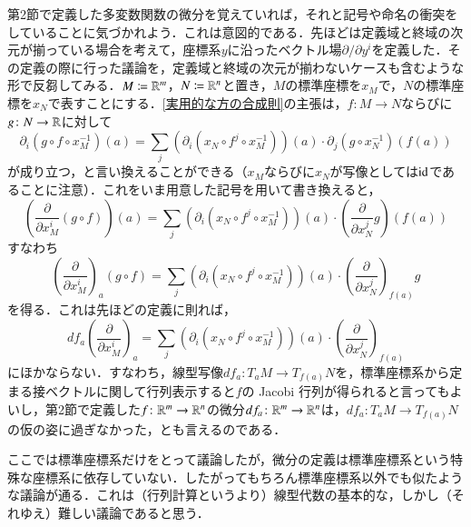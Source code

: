 第2節で定義した多変数関数の微分を覚えていれば，それと記号や命名の衝突をしていることに気づかれよう．これは意図的である．先ほどは定義域と終域の次元が揃っている場合を考えて，座標系$y$に沿ったベクトル場$\partial / \partial y^i$を定義した．その定義の際に行った議論を，定義域と終域の次元が揃わないケースも含むような形で反芻してみる．$M \coloneqq \mathbb{R}^m$，$N \coloneqq \mathbb{R}^n$と置き，$M$の標準座標を$x_M$で，$N$の標準座標を$x_N$で表すことにする．\cref{実用的な方の合成則}の主張は，$f \colon M \to N$ならびに$g \colon N \to \mathbb{R}$に対して
\begin{equation}
\partial_i (g \circ f \circ x_M^{-1}) (a) = \sum_{j} \left( \partial_i (x_N \circ f^j \circ x_M^{-1}) \right) (a) \cdot \partial_j (g \circ x_N^{-1}) (f(a))
\end{equation}が成り立つ，と言い換えることができる（$x_M$ならびに$x_N$が写像としては$\operatorname{id}$であることに注意）．これをいま用意した記号を用いて書き換えると，
\begin{equation}
\left( \frac{\partial}{\partial x^i_M} (g \circ f) \right) (a) = \sum_{j} \left( \partial_i (x_N \circ f^j \circ x_M^{-1}) \right) (a) \cdot \left(\frac{\partial}{\partial x_N^j} g\right) (f(a))
\end{equation}
すなわち
\begin{equation}
\left( \frac{\partial}{\partial x^i_M} \right)_a (g \circ f) = \sum_{j} \left( \partial_i (x_N \circ f^j \circ x_M^{-1}) \right) (a) \cdot \left(\frac{\partial}{\partial x_N^j}\right)_{f(a)} g
\end{equation}
を得る．これは先ほどの定義に則れば，
\begin{equation}
df_a \left( \frac{\partial}{\partial x^i_M} \right)_a = \sum_{j} \left( \partial_i (x_N \circ f^j \circ x_M^{-1}) \right) (a) \cdot \left(\frac{\partial}{\partial x_N^j}\right)_{f(a)}
\end{equation}にほかならない．すなわち，線型写像$df_a \colon T_aM \to T_{f(a)}N$を，標準座標系から定まる接ベクトルに関して行列表示すると$f$の Jacobi 行列が得られると言ってもよいし，第2節で定義した$f \colon \mathbb{R}^m \to \mathbb{R}^n$の微分$df_a \colon \mathbb{R}^m \to \mathbb{R}^n$は，$df_a \colon T_aM \to T_{f(a)}N$の仮の姿に過ぎなかった，とも言えるのである．

\begin{que}
ここでは標準座標系だけをとって議論したが，微分の定義は標準座標系という特殊な座標系に依存していない．したがってもちろん標準座標系以外でも似たような議論が通る．これは（行列計算というより）線型代数の基本的な，しかし（それゆえ）難しい議論であると思う．
\end{que}

